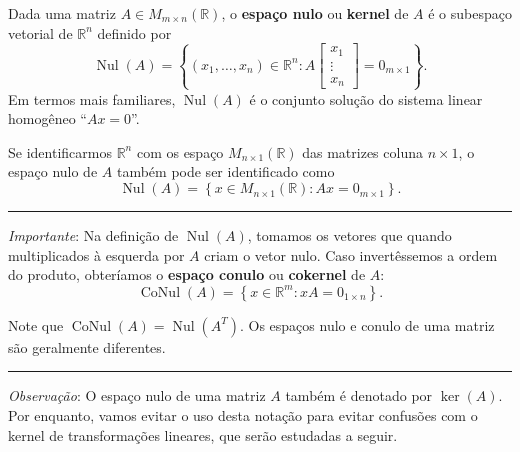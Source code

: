 \begin{definition}
	Dada uma matriz $A\in M_{m\times n}(\mathbb{R})$, o \textbf{espaço nulo} ou \textbf{kernel} de $A$ é o subespaço vetorial de $\mathbb{R}^n$ definido por
	\[\operatorname{Nul}(A)=\left\{(x_1,\ldots,x_n)\in\mathbb{R}^n:A\begin{bmatrix}x_1\\\vdots\\x_n\end{bmatrix}=0_{m\times 1}\right\}.\]
	Em termos mais familiares, $\operatorname{Nul}(A)$ é o conjunto solução do sistema linear homogêneo ``$Ax=0$''.

	Se identificarmos $\mathbb{R}^n$ com os espaço $M_{n\times 1}(\mathbb{R})$ das matrizes coluna $n\times 1$, o espaço nulo de $A$ também pode ser identificado como
	\[\operatorname{Nul}(A)=\left\{x\in M_{n\times 1}(\mathbb{R}):Ax=0_{m\times 1}\right\}.\]

	\hrule

	\textit{Importante}: Na definição de $\operatorname{Nul}(A)$, tomamos os vetores que quando multiplicados à esquerda por $A$ criam o vetor nulo. Caso invertêssemos a ordem do produto, obteríamos o \textbf{espaço conulo} ou \textbf{cokernel} de $A$:
	\[\operatorname{CoNul}(A)=\left\{x\in\mathbb{R}^m:xA=0_{1\times n}\right\}.\]

	Note que $\operatorname{CoNul}(A)=\operatorname{Nul}(A^T)$. Os espaços nulo e conulo de uma matriz são geralmente diferentes.
	
	\hrule
	
	\textit{Observação}: O espaço nulo de uma matriz $A$ também é denotado por $\operatorname{ker}(A)$. Por enquanto, vamos evitar o uso desta notação para evitar confusões com o kernel de transformações lineares, que serão estudadas a seguir.
\end{definition}